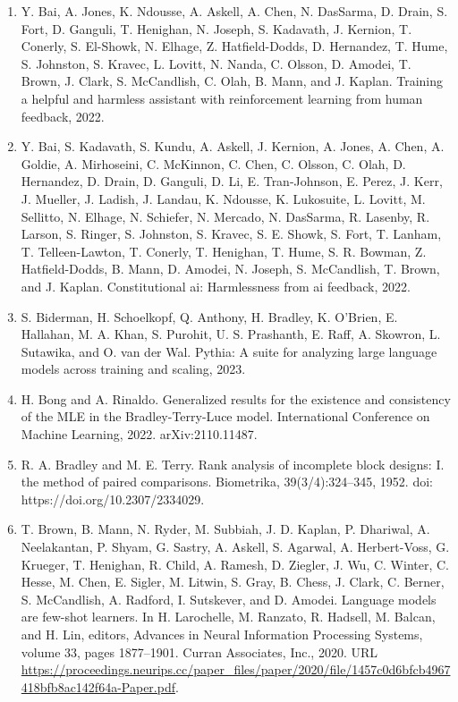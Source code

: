 \documentclass[11pt,UTF8,fontset=fandol]{ctexart}
\begin{document}
\begin{enumerate}[leftmargin=2.2em, itemsep=2pt]
\item Y. Bai, A. Jones, K. Ndousse, A. Askell, A. Chen, N. DasSarma, D. Drain, S. Fort, D. Ganguli, T. Henighan, N. Joseph, S. Kadavath, J. Kernion, T. Conerly, S. El-Showk, N. Elhage, Z. Hatfield-Dodds, D. Hernandez, T. Hume, S. Johnston, S. Kravec, L. Lovitt, N. Nanda, C. Olsson, D. Amodei, T. Brown, J. Clark, S. McCandlish, C. Olah, B. Mann, and J. Kaplan. Training a helpful and harmless assistant with reinforcement learning from human feedback, 2022.
\item Y. Bai, S. Kadavath, S. Kundu, A. Askell, J. Kernion, A. Jones, A. Chen, A. Goldie, A. Mirhoseini, C. McKinnon, C. Chen, C. Olsson, C. Olah, D. Hernandez, D. Drain, D. Ganguli, D. Li, E. Tran-Johnson, E. Perez, J. Kerr, J. Mueller, J. Ladish, J. Landau, K. Ndousse, K. Lukosuite, L. Lovitt, M. Sellitto, N. Elhage, N. Schiefer, N. Mercado, N. DasSarma, R. Lasenby, R. Larson, S. Ringer, S. Johnston, S. Kravec, S. E. Showk, S. Fort, T. Lanham, T. Telleen-Lawton, T. Conerly, T. Henighan, T. Hume, S. R. Bowman, Z. Hatfield-Dodds, B. Mann, D. Amodei, N. Joseph, S. McCandlish, T. Brown, and J. Kaplan. Constitutional ai: Harmlessness from ai feedback, 2022.
\item S. Biderman, H. Schoelkopf, Q. Anthony, H. Bradley, K. O'Brien, E. Hallahan, M. A. Khan, S. Purohit, U. S. Prashanth, E. Raff, A. Skowron, L. Sutawika, and O. van der Wal. Pythia: A suite for analyzing large language models across training and scaling, 2023.
\item H. Bong and A. Rinaldo. Generalized results for the existence and consistency of the MLE in the Bradley-Terry-Luce model. International Conference on Machine Learning, 2022. arXiv:2110.11487.
\item R. A. Bradley and M. E. Terry. Rank analysis of incomplete block designs: I. the method of paired comparisons. Biometrika, 39(3/4):324--345, 1952. doi: https://doi.org/10.2307/2334029.
\item T. Brown, B. Mann, N. Ryder, M. Subbiah, J. D. Kaplan, P. Dhariwal, A. Neelakantan, P. Shyam, G. Sastry, A. Askell, S. Agarwal, A. Herbert-Voss, G. Krueger, T. Henighan, R. Child, A. Ramesh, D. Ziegler, J. Wu, C. Winter, C. Hesse, M. Chen, E. Sigler, M. Litwin, S. Gray, B. Chess, J. Clark, C. Berner, S. McCandlish, A. Radford, I. Sutskever, and D. Amodei. Language models are few-shot learners. In H. Larochelle, M. Ranzato, R. Hadsell, M. Balcan, and H. Lin, editors, Advances in Neural Information Processing Systems, volume 33, pages 1877--1901. Curran Associates, Inc., 2020. URL \url{https://proceedings.neurips.cc/paper_files/paper/2020/file/1457c0d6bfcb4967418bfb8ac142f64a-Paper.pdf}.

\end{enumerate}
\end{document}
